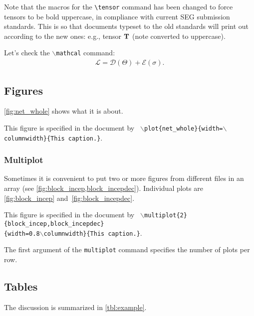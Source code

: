 \documentclass[wordlite,texlive,final,calfont]{segabs}
\begin{document}
Note that the macros for the \verb#\tensor# command has been changed
to force tensors to be bold uppercase, in compliance with current SEG
submission standards. This is so that documents typeset to the old
standards will print out according to the new ones: e.g., tensor
$\tensor{t}$ (note converted to uppercase).

Let's check the \texttt{$\backslash$mathcal} command:
\begin{eqnarray}
  \mathcal{L} = \mathcal{D}(\Theta) + \mathcal{E}(\sigma).
\end{eqnarray}

\subsection*{Figures}
\renewcommand{\figdir}{Fig} %

\autoref{fig:net_whole} shows what it is about.

{This figure is specified in the document by \texttt{
    $\backslash$plot\{net\_whole\}\{width=$\backslash$columnwidth\}\{This caption.\}}.
}

\subsubsection{Multiplot} 

Sometimes it is convenient to put two or
more figures from different files in an array (see
\autoref{fig:block_incep,block_incepdec}). Individual plots are
\autoref{fig:block_incep} and~\autoref{fig:block_incepdec}.

{This figure is specified in the document by \texttt{
    $\backslash$multiplot\{2\}\{block\_incep,block\_incepdec\}\\\{width=0.8$\backslash$columnwidth\}\{This caption.\}}.
}

The first argument of the \texttt{multiplot} command specifies the
number of plots per row.

\subsection{Tables}

The discussion is summarized in \autoref{tbl:example}.
\end{document}
